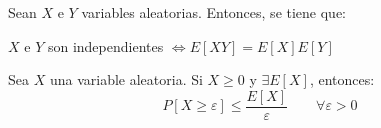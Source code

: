 \begin{prop} \label{prop:Esperanza_Independendientes}
    Sean $X$ e $Y$ variables aleatorias. Entonces, se tiene que:
    \begin{center}
        $X$ e $Y$ son independientes $\Longleftrightarrow E[XY]=E[X]E[Y]$
    \end{center}
\end{prop}


\begin{teo}
    Sea $X$ una variable aleatoria. Si $X\geq 0$ y $\exists E[X]$, entonces:
    \begin{equation*}
        P[X\geq \varepsilon]\leq \dfrac{E[X]}{\varepsilon} \qquad \forall \varepsilon>0 
    \end{equation*}
\end{teo}
